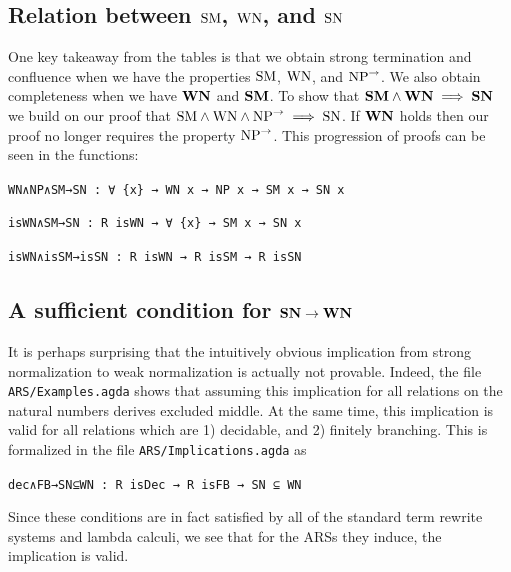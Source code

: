 \subsection{Relation between $\mathrm{SM}$, $\mathrm{WN}$, and $\mathrm{SN}$} \label{subsec:SMWNSN}
One key takeaway from the tables is that we obtain strong termination and confluence when we have the properties $\mathrm{SM}$, $\mathrm{WN}$, and $\mathrm{NP}^{\to}$. We also
obtain completeness when we have $\mathbf{WN}$ and $\mathbf{SM}$.
To show that $\mathbf{SM} \land \mathbf{WN} \implies \mathbf{SN}$ we build on our proof that $\mathrm{SM} \land \mathrm{WN} \land \mathrm{NP}^{\to} \implies \mathrm{SN}$. If $\mathbf{WN}$ holds
then our proof no longer requires the property $\mathrm{NP}^{\to}$. This progression of proofs can be seen in the functions:

\verb|WN∧NP∧SM→SN : ∀ {x} → WN x → NP x → SM x → SN x|

\verb|isWN∧SM→SN : R isWN → ∀ {x} → SM x → SN x|

\verb|isWN∧isSM→isSN : R isWN → R isSM → R isSN|

\subsection{A sufficient condition for $\mathbf{SN} \to \mathbf{WN}$}
\label{sec:SNtoWN}
It is perhaps surprising that the intuitively obvious implication from strong
normalization to weak normalization is actually not provable.
Indeed, the file \texttt{ARS/Examples.agda} shows that assuming this implication 
for all relations on the natural numbers derives excluded middle.
At the same time, this implication is valid for all relations which are
1) decidable, and 2) finitely branching.
This is formalized in the file \texttt{ARS/Implications.agda} as 

\verb|dec∧FB→SN⊆WN : R isDec → R isFB → SN ⊆ WN| 

Since these conditions are in fact satisfied by all of the standard
term rewrite systems and lambda calculi, we see that for the ARSs they induce, the implication
is valid.
